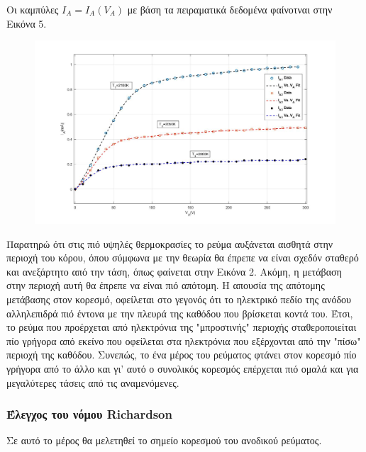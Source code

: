 \documentclass[a4paper]{article}
\begin{document}
Οι καμπύλες $I_{A} = I_{A}(V_A)$ με βάση τα πειραματικά δεδομένα φαίνοτναι στην Εικόνα 5.


\newpage

\begin{figure}
\centering
\caption{ }
\includegraphics[scale=0.35]{i(v)_exper.jpg}
\end{figure}

Παρατηρώ ότι στις πιό υψηλές θερμοκρασίες το ρεύμα αυξάνεται αισθητά στην περιοχή του κόρου, όπου σύμφωνα με την θεωρία θα έπρεπε να είναι σχεδόν σταθερό και ανεξάρτητο από την τάση, όπως φαίνεται στην Εικόνα 2. Ακόμη, η μετάβαση στην περιοχή αυτή θα έπρεπε να είναι πιό απότομη. Η απουσία της απότομης μετάβασης στον κορεσμό, οφείλεται στο γεγονός ότι το ηλεκτρικό πεδίο της ανόδου αλληλεπιδρά πιό έντονα με την πλευρά της καθόδου που βρίσκεται κοντά του. Έτσι, το ρεύμα που προέρχεται από ηλεκτρόνια της "μπροστινής" περιοχής σταθεροποιείται πίο γρήγορα από εκείνο που οφείλεται στα ηλεκτρόνια που εξέρχονται από την "πίσω" περιοχή της καθόδου. Συνεπώς, το ένα μέρος του ρεύματος φτάνει στον κορεσμό πίο γρήγορα από το άλλο και γι' αυτό ο συνολικός κορεσμός επέρχεται πιό ομαλά και για μεγαλύτερες τάσεις από τις αναμενόμενες.


\subsubsection*{Έλεγχος του νόμου Richardson}
Σε αυτό το μέρος θα μελετηθεί το σημείο κορεσμού του ανοδικού ρεύματος.
\end{document}
